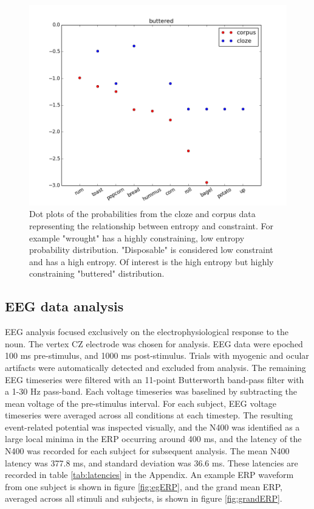 \documentclass{article}
\begin{document}
\begin{figure}
\begin{minipage}{0.33\textwidth}
    		\includegraphics[width=\textwidth]{figures/buttered_dist}
	\end{minipage}
	\caption{Dot plots of the probabilities from the cloze and corpus data representing the relationship between entropy and constraint. For example "wrought" has a highly constraining, low entropy probability distribution. "Disposable" is considered low constraint and has a high entropy. Of interest is the high entropy but highly constraining "buttered" distribution.}
    \label{fig:probability_distributions}
\end{figure}


\subsection{EEG data analysis}

EEG analysis focused exclusively on the electrophysiological response to the noun. The vertex CZ electrode was chosen for analysis. EEG data were epoched 100 ms pre-stimulus, and 1000 ms post-stimulus. Trials with myogenic and ocular artifacts were automatically detected and excluded from analysis. The remaining EEG timeseries were filtered with an 11-point Butterworth band-pass filter with a 1-30 Hz pass-band. Each voltage timeseries was baselined by subtracting the mean voltage of the pre-stimulus interval. For each subject, EEG voltage timeseries were averaged across all conditions at each timestep. The resulting event-related potential was inspected visually, and the N400 was identified as a large local minima in the ERP occurring around 400 ms, and the latency of the N400 was recorded for each subject for subsequent analysis. The mean N400 latency was 377.8 ms, and standard deviation was 36.6 ms. These latencies are recorded in table \ref{tab:latencies} in the Appendix. An example ERP waveform from one subject is shown in figure \ref{fig:egERP}, and the grand mean ERP, averaged across all stimuli and subjects, is shown in figure \ref{fig:grandERP}.
\end{document}
